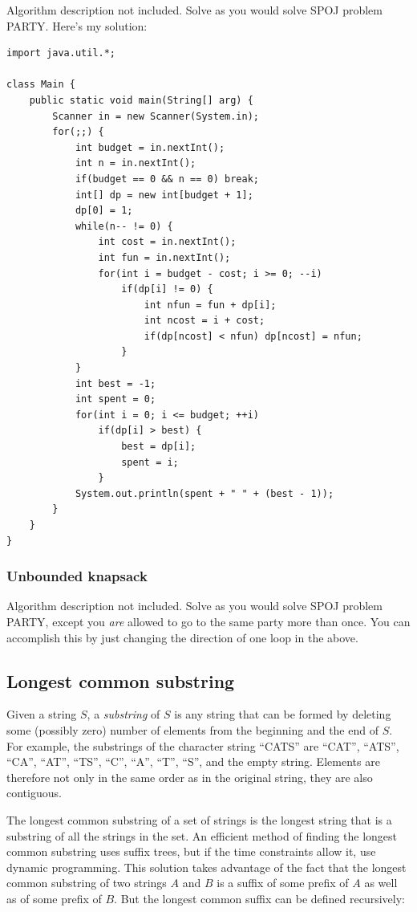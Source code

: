 \documentclass[a4paper,12pt]{article}
\begin{document}
Algorithm description not included. Solve as you would solve SPOJ problem PARTY. Here's my solution:
\begin{lstlisting}
import java.util.*;

class Main {
	public static void main(String[] arg) {
		Scanner in = new Scanner(System.in);
		for(;;) {
			int budget = in.nextInt();
			int n = in.nextInt();
			if(budget == 0 && n == 0) break;
			int[] dp = new int[budget + 1];
			dp[0] = 1;
			while(n-- != 0) {
				int cost = in.nextInt();
				int fun = in.nextInt();
				for(int i = budget - cost; i >= 0; --i)
					if(dp[i] != 0) {
						int nfun = fun + dp[i];
						int ncost = i + cost;
						if(dp[ncost] < nfun) dp[ncost] = nfun;
					}
			}
			int best = -1;
			int spent = 0;
			for(int i = 0; i <= budget; ++i)
				if(dp[i] > best) {
					best = dp[i];
					spent = i;
				}
			System.out.println(spent + " " + (best - 1));
		}
	}
}
\end{lstlisting}

\subsubsection{Unbounded knapsack}

Algorithm description not included. Solve as you would solve SPOJ problem PARTY, except you {\em are} allowed to go to the same party more than once. You can accomplish this by just changing the direction of one loop in the above.

\subsection{Longest common substring}

Given a string $S$, a {\em substring} of $S$ is any string that can be formed by deleting some (possibly zero) number of elements from the beginning and the end of $S$. For example, the substrings of the character string ``CATS'' are ``CAT'', ``ATS'', ``CA'', ``AT'', ``TS'', ``C'', ``A'', ``T'', ``S'', and the empty string. Elements are therefore not only in the same order as in the original string, they are also contiguous. 

The longest common substring of a set of strings is the longest string that is a substring of all the strings in the set. An efficient method of finding the longest common substring uses suffix trees, but if the time constraints allow it, use dynamic programming. This solution takes advantage of the fact that the longest common substring of two strings $A$ and $B$ is a suffix of some prefix of $A$ as well as of some prefix of $B$. But the longest common suffix can be defined recursively:
\end{document}
